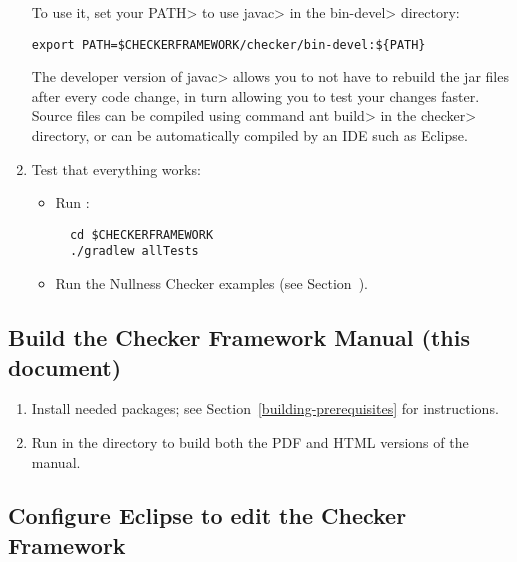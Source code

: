 \begin{enumerate}
To use it, set your \<PATH> to use \<javac> in the \<bin-devel> directory:

\begin{Verbatim}
export PATH=$CHECKERFRAMEWORK/checker/bin-devel:${PATH}
\end{Verbatim}

The developer version of \<javac> allows you to not have to rebuild
the jar files after every code change, in turn allowing you to test
your changes faster. Source files can be compiled using command \<ant
build> in the \<checker> directory, or can be automatically compiled by
an IDE such as Eclipse.

\item Test that everything works:

  \begin{itemize}

  \item Run :
\begin{Verbatim}
  cd $CHECKERFRAMEWORK
  ./gradlew allTests
\end{Verbatim}

  \item Run the Nullness Checker examples (see
    Section~).

  \end{itemize}

\end{enumerate}


\subsection{Build the Checker Framework Manual (this document)\label{building-manual}}

\begin{enumerate}
\item
Install needed packages; see Section~\ref{building-prerequisites} for
instructions.

\item
Run  in the  directory to build both the PDF and HTML versions of the manual.
\end{enumerate}


\subsection{Configure Eclipse to edit the Checker Framework\label{building-eclipse}}

